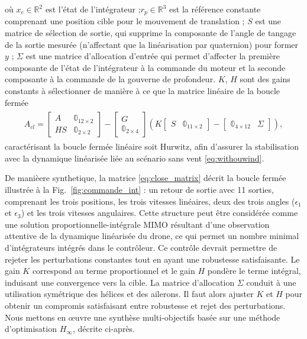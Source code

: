 où $x_{c} \in \mathbb{R}^{2}$ est l'état de l'intégrateur ;$r_{p} \in \mathbb{R}^{3}$ est la référence constante comprenant une position cible pour le mouvement de translation ; $S$ est une matrice de sélection de sortie, qui supprime la composante de l'angle de tangage de la sortie mesurée (n'affectant que la linéarisation par quaternion) pour former $y$ ; $\Sigma$ est une matrice d'allocation d'entrée qui permet d'affecter la première composante de l'état de l'intégrateur à la commande du moteur et la seconde composante à la commande de la gouverne de profondeur. $K$, $H$ sont des gains constants à sélectionner de manière à ce que la matrice linéaire de la boucle fermée 
\begin{align} \label{eq:close_matrix}
    \begin{gathered}
        A_{cl} \!= \!
        \begin{bmatrix}A & \mathbb{0}_{12\times 2} \\ HS & \mathbb{0}_{2\times 2}\end{bmatrix} \!- \!\begin{bmatrix}G \\ \mathbb{0}_{2\times 4}\end{bmatrix} \left( K \begin{bmatrix}S & \mathbb{0}_{11\times 2}\end{bmatrix} -  \begin{bmatrix}\mathbb{0}_{4\times 12} & \Sigma \end{bmatrix}\right),
    \end{gathered}
\end{align}
caractérisant la boucle fermée linéaire soit Hurwitz, afin d'assurer la stabilisation avec la dynamique linéarisée liée au scénario sans vent \eqref{eq:withouwind}.

De manièere synthetique, la matrice \eqref{eq:close_matrix} décrit la boucle fermée illustrée à la Fig.~\ref{fig:commande_int} : un retour de sortie avec 11 sorties, comprenant les trois positions, les trois vitesses linéaires, deux des trois angles ($\epsilon_{1}$ et $\epsilon_{3}$) et les trois vitesses angulaires. Cette structure peut être considérée comme une solution proportionnelle-intégrale MIMO résultant d'une observation attentive de la dynamique linéarisée du drone, ce qui permet un nombre minimal d'intégrateurs intégrés dans le contrôleur. Ce contrôle devrait permettre de rejeter les perturbations constantes tout en ayant une robustesse satisfaisante. Le gain $K$ correspond au terme proportionnel et le gain $H$ pondère le terme intégral, induisant une convergence vers la cible. La matrice d'allocation $\Sigma$ conduit à une utilisation symétrique des hélices et des ailerons. Il faut alors ajuster $K$ et $H$ pour obtenir un compromis satisfaisant entre robustesse et rejet des perturbations. Nous mettons en œuvre une synthèse multi-objectifs basée sur une méthode d'optimisation $H_{\infty}$, décrite ci-après.

